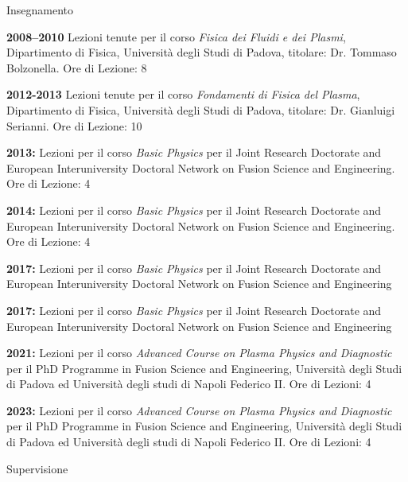 \begin{statementblock}{Insegnamento}
\end{statementblock}
\begin{enumerate}[label={[H\arabic*]}]
\item \textbf{2008--2010} Lezioni tenute per il corso \emph{Fisica dei Fluidi e
    dei Plasmi}, Dipartimento di Fisica,  Universit{\`a} degli Studi
  di Padova, titolare: Dr. Tommaso Bolzonella. Ore di Lezione: 8

\item \textbf{2012-2013} Lezioni tenute per il corso \emph{Fondamenti di Fisica
  del Plasma}, Dipartimento di Fisica,  Universit{\`a} degli Studi
  di Padova, titolare: Dr. Gianluigi Serianni. Ore di Lezione: 10

\item \textbf{2013:} Lezioni per il corso \emph{Basic Physics} per il Joint Research Doctorate
and European Interuniversity Doctoral Network on Fusion Science and
Engineering. Ore di Lezione: 4

\item \textbf{2014:} Lezioni per il corso \emph{Basic Physics} per il Joint Research Doctorate
and European Interuniversity Doctoral Network on Fusion Science and
Engineering. Ore di Lezione: 4

\item \textbf{2017:} Lezioni per il corso \emph{Basic Physics} per il Joint Research Doctorate
and European Interuniversity Doctoral Network on Fusion Science and
Engineering 

\item \textbf{2017:} Lezioni per il corso \emph{Basic Physics} per il Joint Research Doctorate
and European Interuniversity Doctoral Network on Fusion Science and
Engineering

\item \textbf{2021:} Lezioni per il corso \emph{Advanced Course on
    Plasma Physics and Diagnostic} per il PhD Programme in Fusion
  Science and Engineering,  Universit\`a degli Studi di Padova ed
  Universit\`a degli studi di Napoli Federico II. Ore di Lezioni: 4
  
\item \textbf{2023:} Lezioni per il corso \emph{Advanced Course on
    Plasma Physics and Diagnostic} per il PhD Programme in Fusion
  Science and Engineering,  Universit\`a degli Studi di Padova ed
  Universit\`a degli studi di Napoli Federico II. Ore di Lezioni: 4
\end{enumerate}
\begin{statementblock}{Supervisione}
\end{statementblock}
